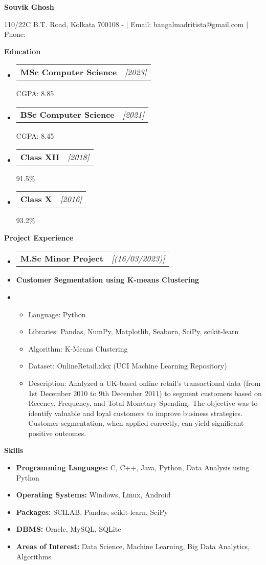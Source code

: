 \documentclass[a4paper,10pt]{article}
\makeatletter
\newcommand{\resitem}[1]{\item #1}
\newcommand{\resheading}[1]{\vspace{0.5em} {\small \colorbox{mygrey}{{\begin{minipage}{0.975\textwidth}{{\textbf{#1}}}\end{minipage}}}} \vspace{0.5em}}
\newcommand{\ressubheading}[3]{\begin{tabular*}{6.62in}{l @{\extracolsep{\fill}} r} \textbf{#1} & \textit{[#2]} \\ \end{tabular*}\vspace{-8pt}}
\makeatother
\begin{document}
\begin{center} \Large{\textbf{Souvik Ghosh}} \end{center}

\vspace{2pt}

\begin{center} 110/22C B.T. Road, Kolkata 700108 - | Email: bangalmadritista@gmail.com | Phone: \end{center}

\resheading{Education}
\begin{itemize}[nosep]
    \resitem{\ressubheading{MSc Computer Science}{2023}{Banaras Hindu University, Varanasi} CGPA: 8.85}
    \resitem{\ressubheading{BSc Computer Science}{2021}{Scottish Church College, University of Calcutta, Kolkata} CGPA: 8.45}
    \resitem{\ressubheading{Class XII}{2018}{Central Modern School, Council for the Indian School Certificate Examinations} 91.5\%}
    \resitem{\ressubheading{Class X}{2016}{Central Modern School, Council for the Indian School Certificate Examinations} 93.2\%}
\end{itemize}

\resheading{Project Experience}
\begin{itemize}[nosep]
    \resitem{\ressubheading{M.Sc Minor Project}{(16/03/2023)}{}}
    \resitem{\textbf{Customer Segmentation using K-means Clustering}}
    \resitem{\begin{itemize}
        \item Language: Python
        \item Libraries: Pandas, NumPy, Matplotlib, Seaborn, SciPy, scikit-learn
        \item Algorithm: K-Means Clustering
        \item Dataset: OnlineRetail.xlsx (UCI Machine Learning Repository)
        \item Description: Analyzed a UK-based online retail’s transactional data (from 1st December 2010 to 9th December 2011) to segment customers based on Recency, Frequency, and Total Monetary Spending. The objective was to identify valuable and loyal customers to improve business strategies. Customer segmentation, when applied correctly, can yield significant positive outcomes.
    \end{itemize}}
\end{itemize}


\resheading{Skills}
\begin{itemize}[nosep]
    \resitem{\textbf{Programming Languages:} C, C++, Java, Python, Data Analysis using Python}
    \resitem{\textbf{Operating Systems:} Windows, Linux, Android}
    \resitem{\textbf{Packages:} SCILAB, Pandas, scikit-learn, SciPy}
    \resitem{\textbf{DBMS:} Oracle, MySQL, SQLite}
    \resitem{\textbf{Areas of Interest:} Data Science, Machine Learning, Big Data Analytics, Algorithms}
\end{itemize}
\end{document}
